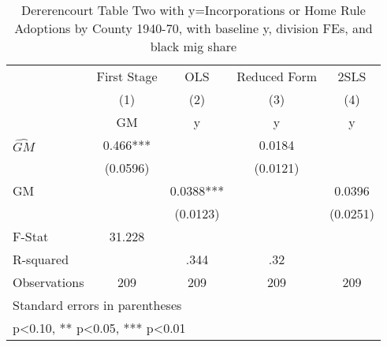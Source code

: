 \begin{table}[htbp]\centering
\def\sym#1{\ifmmode^{#1}\else\(^{#1}\)\fi}
\caption{Dererencourt Table Two with y=Incorporations or Home Rule Adoptions by County 1940-70, with baseline y, division FEs, and black mig share}
\begin{tabular}{l*{4}{c}}
\toprule
                    & First Stage   &         OLS   &Reduced Form   &        2SLS   \\
                    &\multicolumn{1}{c}{(1)}&\multicolumn{1}{c}{(2)}&\multicolumn{1}{c}{(3)}&\multicolumn{1}{c}{(4)}\\
                    &\multicolumn{1}{c}{GM}&\multicolumn{1}{c}{y}&\multicolumn{1}{c}{y}&\multicolumn{1}{c}{y}\\
\midrule
$\hat{GM}$          &       0.466***&               &      0.0184   &               \\
                    &    (0.0596)   &               &    (0.0121)   &               \\
\addlinespace
GM                  &               &      0.0388***&               &      0.0396   \\
                    &               &    (0.0123)   &               &    (0.0251)   \\
\midrule
F-Stat              &      31.228   &               &               &               \\
R-squared           &               &        .344   &         .32   &               \\
Observations        &         209   &         209   &         209   &         209   \\
\bottomrule
\multicolumn{5}{l}{\footnotesize Standard errors in parentheses}\\
\multicolumn{5}{l}{\footnotesize * p<0.10, ** p<0.05, *** p<0.01}\\
\end{tabular}
\end{table}
